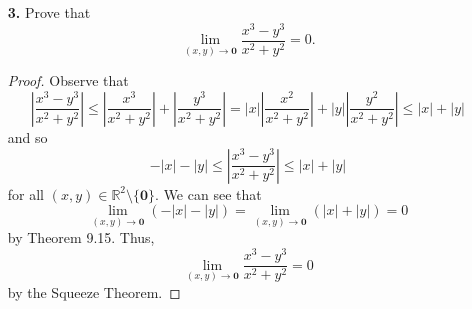 \documentclass[ 12pt ]{article}
\begin{document}
\begin{enumerate}
		\begin{proof}
			Suppose $A, B \subseteq \mathbb{R}^n$ are compact sets with $A \cap B = \varnothing$. Further, suppose by contradiction that dist$(A, B) = 0$. Clearly dist$(A, B)$ exists,
			by the Approximation of Infima we know that for any $\epsilon > 0$ there exists $\textbf{x} \in A$ and $\textbf{y} \in B$ such that
			\begin{align*}
				0 \leq &||\textbf{x} - \textbf{y}|| - \mathrm{dist}(A, B) < \epsilon \\
				0 \leq &||\textbf{x} - \textbf{y}|| < \epsilon.
			\end{align*}
			Suppose $\epsilon = \frac{1}{k}$ where $k \in \mathbb{N}$ which provides sequences $\textbf{a}_k \in A$ and $\textbf{b}_k \in B$. Additionally, the Heine-Borel Theorem
			illustrates that both $A$ and $B$ are closed and and bounded. Furthermore, $\textbf{a}_k$ and $\textbf{b}_k$ must have subsequences $\textbf{a}_{k_j} \to \textbf{a} \in A$
			and $\textbf{b}_{k_j} \to \textbf{b} \in B$, respectively, via the Bolzano-Weierstrass Theorem and Theorem 9.8 that satisfy $$0 \leq ||\textbf{a}_{k_j} - \textbf{b}_{k_j}||
			< \frac{1}{k_j}.$$ Taking the limit of this inequality as $j \to \infty$ provides $||\textbf{a} - \textbf{b}|| = 0$ and so $\textbf{a} = \textbf{b}$ which is a contradiction
			to the assumption $A \cap B = \varnothing$.
		\end{proof}
		\newpage


	\item[\textbf{3.}] Prove that $$\lim_{(x, y) \to \textbf{0}} \frac{x^3 - y^3}{x^2 + y^2} = 0.$$

		\begin{proof}
			Observe that $$\left | \frac{x^3 - y^3}{x^2 + y^2} \right | \leq \left | \frac{x^3}{x^2 + y^2} \right | + \left | \frac{y^3}{x^2 + y^2} \right | =
			|x|\left | \frac{x^2}{x^2 + y^2} \right | + |y|\left | \frac{y^2}{x^2 + y^2} \right | \leq |x| + |y|$$ and so $$-|x| - |y| \leq \left | \frac{x^3 - y^3}{x^2 + y^2} \right |
			\leq |x| + |y|$$ for all $(x, y) \in \mathbb{R}^2 \setminus \{ \textbf{0} \}$. We can see that $$\lim_{(x,y) \to \textbf{0}} (-|x| - |y|) = \lim_{(x,y) \to \textbf{0}}
			(|x| + |y|) = 0$$ by Theorem 9.15. Thus, $$\lim_{(x,y) \to \textbf{0}} \frac{x^3 - y^3}{x^2 + y^2} = 0$$ by the Squeeze Theorem.
		\end{proof}

\end{enumerate}
\end{document}
